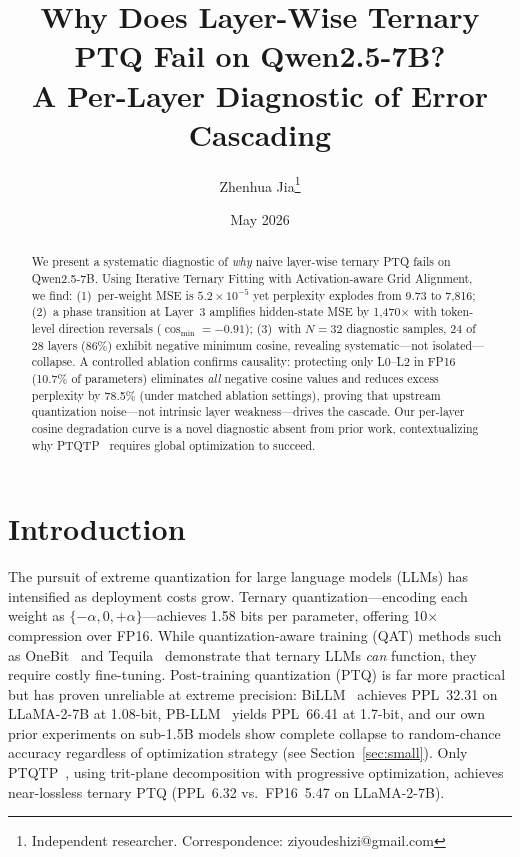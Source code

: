 \documentclass[10pt,a4paper]{article}
\title{Why Does Layer-Wise Ternary PTQ Fail on Qwen2.5-7B?\\
A Per-Layer Diagnostic of Error Cascading}
\author{
  Zhenhua Jia\thanks{Independent researcher. Correspondence: ziyoudeshizi@gmail.com}
}
\date{May 2026}
\begin{document}
\maketitle

\begin{abstract}
We present a systematic diagnostic of \textit{why} naive layer-wise ternary PTQ fails on Qwen2.5-7B.
Using Iterative Ternary Fitting with Activation-aware Grid Alignment, we find: (1)~per-weight MSE is $5.2 \times 10^{-5}$ yet perplexity explodes from 9.73 to 7,816; (2)~a phase transition at Layer~3 amplifies hidden-state MSE by 1,470$\times$ with token-level direction reversals ($\cos_{\min} = -0.91$); (3)~with $N{=}32$ diagnostic samples, 24 of 28 layers (86\%) exhibit negative minimum cosine, revealing systematic---not isolated---collapse.
A controlled ablation confirms causality: protecting only L0--L2 in FP16 (10.7\% of parameters) eliminates \textit{all} negative cosine values and reduces excess perplexity by 78.5\% (under matched ablation settings), proving that upstream quantization noise---not intrinsic layer weakness---drives the cascade.
Our per-layer cosine degradation curve is a novel diagnostic absent from prior work, contextualizing why PTQTP~\citep{ptqtp2025} requires global optimization to succeed.
\end{abstract}

\section{Introduction}
\label{sec:intro}

The pursuit of extreme quantization for large language models (LLMs) has intensified as deployment costs grow.
Ternary quantization---encoding each weight as $\{-\alpha, 0, +\alpha\}$---achieves 1.58 bits per parameter, offering 10$\times$ compression over FP16.
While quantization-aware training (QAT) methods such as OneBit~\citep{onebit2024} and Tequila~\citep{tequila2025} demonstrate that ternary LLMs \textit{can} function, they require costly fine-tuning.
Post-training quantization (PTQ) is far more practical but has proven unreliable at extreme precision: BiLLM~\citep{billm2024} achieves PPL~32.31 on LLaMA-2-7B at 1.08-bit, PB-LLM~\citep{pbllm2024} yields PPL~66.41 at 1.7-bit, and our own prior experiments on sub-1.5B models show complete collapse to random-chance accuracy regardless of optimization strategy (see Section~\ref{sec:small}).
Only PTQTP~\citep{ptqtp2025}, using trit-plane decomposition with progressive optimization, achieves near-lossless ternary PTQ (PPL~6.32 vs.\ FP16~5.47 on LLaMA-2-7B).
\end{document}
